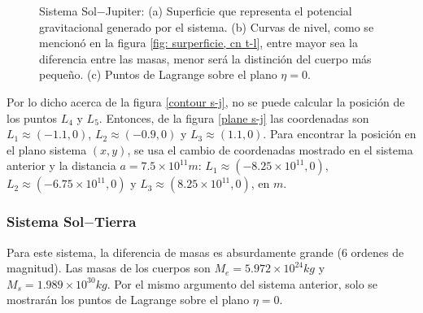 \begin{figure}[H]
\caption{Sistema Sol$-$Jupiter: (a) Superficie que representa el potencial gravitacional generado por el sistema. (b) Curvas de nivel, como se mencionó en la figura \ref{fig: surperficie, cn t-l}, entre mayor sea la diferencia entre las masas, menor será la distinción del cuerpo más pequeño. (c) Puntos de Lagrange sobre el plano $\eta = 0$.}
\label{superficie, cn, plane s-j}
\end{figure}

Por lo dicho acerca de la figura \ref{contour s-j}, no se puede calcular la posición de los puntos $L_4$ y $L_5$. Entonces, de la figura \ref{plane s-j} las coordenadas son $L_1 \approx (-1.1,0)$, $L_2 \approx (-0.9,0)$ y $L_3 \approx (1.1,0)$. Para encontrar la posición en el plano sistema $(x,y)$, se usa el cambio de coordenadas mostrado en el sistema anterior y la distancia $a = 7.5\times 10^{11}m$: $L_1 \approx (-8.25\times 10 ^{11},0)$, $L_2 \approx (-6.75\times 10 ^{11},0)$ y $L_3 \approx (8.25\times 10 ^{11},0)$, en $m$.



\subsubsection{Sistema Sol$-$Tierra}

Para este sistema, la diferencia de masas es absurdamente grande ($6$ ordenes de magnitud). Las masas de los cuerpos son $M_e = 5.972\times 10^{24} kg$ y $M_s = 1.989\times 10 ^{30} kg$. Por el mismo argumento del sistema anterior, solo se mostrarán los puntos de Lagrange sobre el plano $\eta = 0$.


